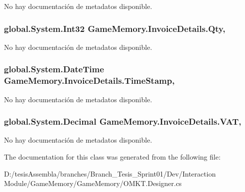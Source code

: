 No hay documentación de metadatos disponible. 

\hypertarget{class_game_memory_1_1_invoice_details_a8b4d80acf70dd427b45bb37590705813}{
\subsubsection[{Qty}]{\setlength{\rightskip}{0pt plus 5cm}global.\-System.\-Int32 Game\-Memory.\-Invoice\-Details.\-Qty\hspace{0.3cm}{\ttfamily [get]}, {\ttfamily [set]}}}\label{class_game_memory_1_1_invoice_details_a8b4d80acf70dd427b45bb37590705813}


No hay documentación de metadatos disponible. 

\hypertarget{class_game_memory_1_1_invoice_details_aa68004d539f2d3f74d809cf395085d5c}{
\subsubsection[{Time\-Stamp}]{\setlength{\rightskip}{0pt plus 5cm}global.\-System.\-Date\-Time Game\-Memory.\-Invoice\-Details.\-Time\-Stamp\hspace{0.3cm}{\ttfamily [get]}, {\ttfamily [set]}}}\label{class_game_memory_1_1_invoice_details_aa68004d539f2d3f74d809cf395085d5c}


No hay documentación de metadatos disponible. 

\hypertarget{class_game_memory_1_1_invoice_details_a593bcc7bd0bcb2e41e6e531065413915}{
\subsubsection[{V\-A\-T}]{\setlength{\rightskip}{0pt plus 5cm}global.\-System.\-Decimal Game\-Memory.\-Invoice\-Details.\-V\-A\-T\hspace{0.3cm}{\ttfamily [get]}, {\ttfamily [set]}}}\label{class_game_memory_1_1_invoice_details_a593bcc7bd0bcb2e41e6e531065413915}


No hay documentación de metadatos disponible. 



The documentation for this class was generated from the following file\-:\begin{DoxyCompactItemize}
\item 
D\-:/tesis\-Assembla/branches/\-Branch\-\_\-\-Tesis\-\_\-\-Sprint01/\-Dev/\-Interaction Module/\-Game\-Memory/\-Game\-Memory/O\-M\-K\-T.\-Designer.\-cs\end{DoxyCompactItemize}

